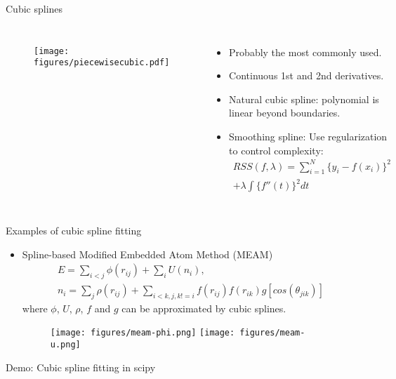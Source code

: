 \documentclass[aspectratio=169]{beamer}
\begin{document}
\begin{frame}{Cubic splines}
    \begin{columns}
    \begin{figure}
        \centering
        \texttt{[image: figures/piecewisecubic.pdf]}
    \end{figure}
    \begin{itemize}
        \item Probably the most commonly used.
        \item Continuous 1st and 2nd derivatives.
        \item Natural cubic spline: polynomial is linear beyond boundaries.
        \item Smoothing spline: Use  regularization to control complexity:
        \begin{eqnarray*}
            RSS(f, \lambda) = \sum_{i=1}^N \{y_i - f(x_i)\} ^ 2 \\
            + \lambda \int \{f''(t)\}^2 dt
        \end{eqnarray*}
    \end{itemize}
    \end{columns}
\end{frame}


\begin{frame}{Examples of cubic spline fitting}
    \begin{itemize}
        \item Spline-based Modified Embedded Atom Method (MEAM)
        \begin{eqnarray*}
            E = \sum_{i <j} \phi(r_{ij}) + \sum_i U(n_i), \\
            n_i = \sum_j \rho(r_{ij}) + \sum_{i < k, j,k!=i} f(r_{ij}) f(r_{ik})g[cos(\theta_{jik})]
        \end{eqnarray*}
        where $\phi$, $U$, $\rho$, $f$ and $g$ can be approximated by cubic splines. 
        \begin{figure}
            \centering
            \texttt{[image: figures/meam-phi.png]}
            \texttt{[image: figures/meam-u.png]}

        \end{figure}
    \end{itemize}
\end{frame} 


\begin{frame}[fragile]{Demo: Cubic spline fitting in scipy}
    \inputminted{python}{example_sklearn_spline.py}
\end{frame} 
\end{document}
